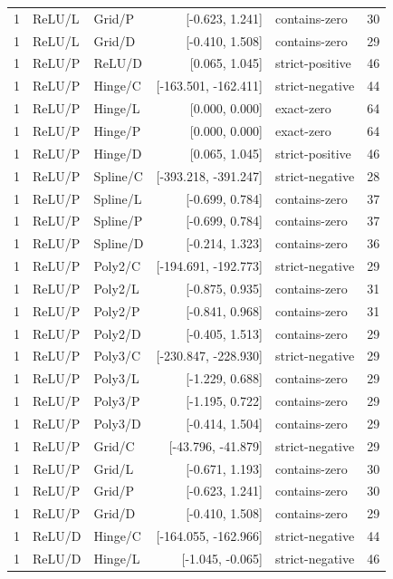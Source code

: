 \begin{longtable}{lllrlr}
1 & ReLU/L & Grid/P & [-0.623, 1.241] & contains-zero & 30 \\
1 & ReLU/L & Grid/D & [-0.410, 1.508] & contains-zero & 29 \\
1 & ReLU/P & ReLU/D & [0.065, 1.045] & strict-positive & 46 \\
1 & ReLU/P & Hinge/C & [-163.501, -162.411] & strict-negative & 44 \\
1 & ReLU/P & Hinge/L & [0.000, 0.000] & exact-zero & 64 \\
1 & ReLU/P & Hinge/P & [0.000, 0.000] & exact-zero & 64 \\
1 & ReLU/P & Hinge/D & [0.065, 1.045] & strict-positive & 46 \\
1 & ReLU/P & Spline/C & [-393.218, -391.247] & strict-negative & 28 \\
1 & ReLU/P & Spline/L & [-0.699, 0.784] & contains-zero & 37 \\
1 & ReLU/P & Spline/P & [-0.699, 0.784] & contains-zero & 37 \\
1 & ReLU/P & Spline/D & [-0.214, 1.323] & contains-zero & 36 \\
1 & ReLU/P & Poly2/C & [-194.691, -192.773] & strict-negative & 29 \\
1 & ReLU/P & Poly2/L & [-0.875, 0.935] & contains-zero & 31 \\
1 & ReLU/P & Poly2/P & [-0.841, 0.968] & contains-zero & 31 \\
1 & ReLU/P & Poly2/D & [-0.405, 1.513] & contains-zero & 29 \\
1 & ReLU/P & Poly3/C & [-230.847, -228.930] & strict-negative & 29 \\
1 & ReLU/P & Poly3/L & [-1.229, 0.688] & contains-zero & 29 \\
1 & ReLU/P & Poly3/P & [-1.195, 0.722] & contains-zero & 29 \\
1 & ReLU/P & Poly3/D & [-0.414, 1.504] & contains-zero & 29 \\
1 & ReLU/P & Grid/C & [-43.796, -41.879] & strict-negative & 29 \\
1 & ReLU/P & Grid/L & [-0.671, 1.193] & contains-zero & 30 \\
1 & ReLU/P & Grid/P & [-0.623, 1.241] & contains-zero & 30 \\
1 & ReLU/P & Grid/D & [-0.410, 1.508] & contains-zero & 29 \\
1 & ReLU/D & Hinge/C & [-164.055, -162.966] & strict-negative & 44 \\
1 & ReLU/D & Hinge/L & [-1.045, -0.065] & strict-negative & 46 \\

\end{longtable}
